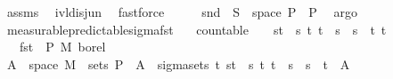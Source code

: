 \begin{isabellebody}
\ assms{\isacharparenleft}{\kern0pt}{}{\isacharcomma}{\kern0pt}{}{\isacharparenright}{\kern0pt}\ \isamarkupfalse%
\ ivl{\isacharunderscore}{\kern0pt}disj{\isacharunderscore}{\kern0pt}un{\isacharparenleft}{\kern0pt}{}{\isacharparenright}{\kern0pt}\ \isamarkupfalse%
\ fastforce\isanewline
\ \ \isamarkupfalse%
\ \isamarkupfalse%
\ {\isachardoublequoteopen}snd\ {\isacharminus}{\kern0pt}{\isacharbackquote}{\kern0pt}\ S\ {\isasyminter}\ space\ {\isasymSigma}\isactrlsub P\ {\isasymin}\ {\isasymSigma}\isactrlsub P{\isachardoublequoteclose}\ \isamarkupfalse%
\ argo\isanewline
{}\isamarkupfalse%
%
\endisatagproof
{\isafoldproof}%
%
\isadelimproof
\isanewline
%
\endisadelimproof
\isanewline
{}\isamarkupfalse%
\ measurable{\isacharunderscore}{\kern0pt}predictable{\isacharunderscore}{\kern0pt}sigma{\isacharunderscore}{\kern0pt}fst{\isacharcolon}{\kern0pt}\isanewline
\ \ \ {\isachardoublequoteopen}countable\ {\isasymI}{\isachardoublequoteclose}\ {\isachardoublequoteopen}{\isasymI}\ {\isasymsubseteq}\ {\isacharbraceleft}{\kern0pt}{\isacharbraceleft}{\kern0pt}s{\isacharless}{\kern0pt}{\isachardot}{\kern0pt}{\isachardot}{\kern0pt}t{\isacharbraceright}{\kern0pt}\ {\isacharbar}{\kern0pt}\ s\ t{\isachardot}{\kern0pt}\ t\ {\isasymle}\ s\ {\isasymand}\ s\ {\isacharless}{\kern0pt}\ t{\isacharbraceright}{\kern0pt}{\isachardoublequoteclose}\ {\isachardoublequoteopen}{\isacharbraceleft}{\kern0pt}t\ {\isasymsubseteq}\ {\isacharparenleft}{\kern0pt}{\isasymUnion}{\isasymI}{\isacharparenright}{\kern0pt}{\isachardoublequoteclose}\isanewline
\ \ \ {\isachardoublequoteopen}fst\ {\isasymin}\ {\isasymSigma}\isactrlsub P\ {\isasymrightarrow}\isactrlsub M\ borel{\isachardoublequoteclose}\isanewline
%
\isadelimproof
%
\endisadelimproof
%
\isatagproof
{}\isamarkupfalse%
\ {\isacharminus}{\kern0pt}\isanewline
\ \ \isamarkupfalse%
\ {\isachardoublequoteopen}A\ {\isasymtimes}\ space\ M\ {\isasymin}\ sets\ {\isasymSigma}\isactrlsub P{\isachardoublequoteclose}\ \ {\isachardoublequoteopen}A\ {\isasymin}\ sigma{\isacharunderscore}{\kern0pt}sets\ {\isacharbraceleft}{\kern0pt}t\ {\isacharbraceleft}{\kern0pt}{\isacharbraceleft}{\kern0pt}s{\isacharless}{\kern0pt}{\isachardot}{\kern0pt}{\isachardot}{\kern0pt}t{\isacharbraceright}{\kern0pt}\ {\isacharbar}{\kern0pt}\ s\ t{\isachardot}{\kern0pt}\ t\ {\isasymle}\ s\ {\isasymand}\ s\ {\isacharless}{\kern0pt}\ t{\isacharbraceright}{\kern0pt}{\isachardoublequoteclose}\ \ A\ \isamarkupfalse%

\end{isabellebody}
